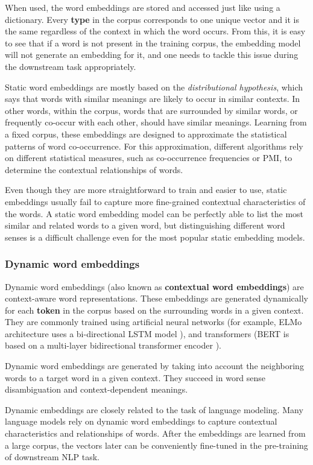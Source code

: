 When used, the word embeddings are stored and accessed just like using a dictionary. Every \textbf{type} in the corpus corresponds to one unique vector and it is the same regardless of the context in which the word occurs. From this, it is easy to see that if a word is not present in the training corpus, the embedding model will not generate an embedding for it, and one needs to tackle this issue during the downstream task appropriately.

Static word embeddings are mostly based on the \textit{distributional hypothesis}, which says that words with similar meanings are likely to occur in similar contexts. In other words, within the corpus, words that are surrounded by similar words, or frequently co-occur with each other, should have similar meanings. Learning from a fixed corpus, these embeddings are designed to approximate the statistical patterns of word co-occurrence. For this approximation, different algorithms rely on different statistical measures, such as co-occurrence frequencies or \ac{PMI}, to determine the contextual relationships of words.

Even though they are more straightforward to train and easier to use, static embeddings usually fail to capture more fine-grained contextual characteristics of the words. A static word embedding model can be perfectly able to list the most similar and related words to a given word, but distinguishing different word senses is a difficult challenge even for the most popular static embedding models.

\subsubsection{Dynamic word embeddings}

Dynamic word embeddings (also known as \textbf{contextual word embeddings}) are context-aware word representations. These embeddings are generated dynamically for each \textbf{token} in the corpus based on the surrounding words in a given context. They are commonly trained using artificial neural networks (for example, \ac{ELMo} architecture uses a bi-directional \ac{LSTM} model \cite{elmo}), and transformers (\ac{BERT} is based on a multi-layer bidirectional transformer encoder \cite{bert}).

Dynamic word embeddings are generated by taking into account the neighboring words to a target word in a given context. They succeed in word sense disambiguation and context-dependent meanings.

Dynamic embeddings are closely related to the task of language modeling. Many language models rely on dynamic word embeddings to capture contextual characteristics and relationships of words. After the embeddings are learned from a large corpus, the vectors later can be conveniently fine-tuned in the pre-training of downstream \ac{NLP} task.









